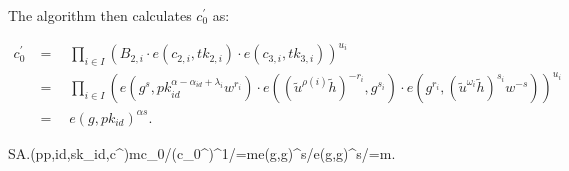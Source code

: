 \documentclass[runningheads]{llncs}
\begin{document}
The algorithm then calculates $c_0^{\prime}$ as:

$$\begin{aligned}c_{0}^{\prime}&=\quad\prod_{i\in I}\left(B_{2,i}\cdot e(c_{2,i},tk_{2,i})\cdot e(c_{3,i},tk_{3,i})\right)^{u_{i}}\\&=\quad\prod_{i\in I}(e(g^{s},pk_{id}^{\alpha-\alpha_{id}+\lambda_{i}}w^{r_{i}})\cdot e((\tilde{u}^{\rho(i)}\tilde{h})^{-r_{i}},g^{s_{i}})\cdot e(g^{r_{i}},(\tilde{u}^{\omega_{i}}\tilde{h})^{s_{i}}w^{-s}))^{u_{i}}\\&=\quad e(g,pk_{id})^{\alpha s}.\end{aligned}$$

SA.(pp,id,sk_{id},c^{\prime})mc_{0}/(c_{0}^{\prime})^{1/\beta}=m\cdot e(g,g)^{\alpha s}/e(g,g)^{\alpha\beta s/\beta}=m.
\end{document}
